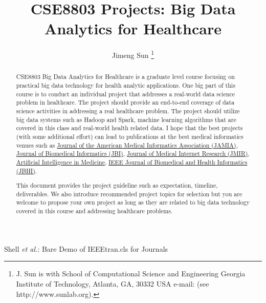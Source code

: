\documentclass[journal]{IEEEtran}
\begin{document}
%
\title{CSE8803 Projects: Big Data Analytics for Healthcare }
%
%
%

\author{Jimeng Sun
\thanks{J. Sun is with School of Computational Science and Engineering Georgia Institute of Technology, Atlanta,
GA, 30332 USA e-mail: (see http://www.sunlab.org).}}


%
{Shell \MakeLowercase{\textit{et al.}}: Bare Demo of IEEEtran.cls for Journals}

\maketitle

\begin{abstract}
CSE8803 Big Data Analytics for Healthcare is a graduate level course focusing on practical big data technology for health analytic applications. One big part of this course is to conduct an individual project that addresses a real-world data science problem in healthcare. The project should provide an end-to-end coverage of data science activities in addressing a real healthcare problem. The project should utilize big data systems such as Hadoop and Spark, machine learning algorithms that are covered in this class and real-world health related data. I hope that the best projects (with some additional effort) can  lead to publications at the best medical informatics venues such as \href{https://jamia.oxfordjournals.org/}{Journal of the American Medical Informatics Association (JAMIA)}, \href{http://www.journals.elsevier.com/journal-of-biomedical-informatics/}{Journal of Biomedical Informatics (JBI)}, \href{http://www.jmir.org/}{Journal of Medical Internet Research (JMIR)}, \href{http://www.journals.elsevier.com/artificial-intelligence-in-medicine/}{Artificial Intelligence in Medicine}, \href{http://jbhi.embs.org/}{IEEE Journal of Biomedical and Health Informatics (JBHI)}. 

This document provides the project guideline such as expectation, timeline, deliverables. We also introduce recommended project topics for selection but you are welcome to propose your own project as long as they are related to big data technology covered in this course and addressing healthcare problems. 
\end{abstract}
\end{document}
